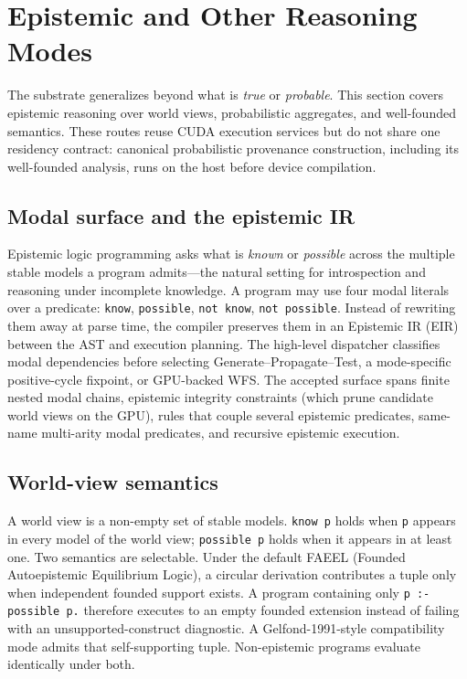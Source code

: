 \section{Epistemic and Other Reasoning Modes}\label{sec:epistemic}

The substrate generalizes beyond what is \emph{true} or \emph{probable}. This section covers epistemic reasoning over world views, probabilistic aggregates, and well-founded semantics. These routes reuse CUDA execution services but do not share one residency contract: canonical probabilistic provenance construction, including its well-founded analysis, runs on the host before device compilation.

\subsection{Modal surface and the epistemic IR}

Epistemic logic programming asks what is \emph{known} or \emph{possible} across the multiple stable models a program admits---the natural setting for introspection and reasoning under incomplete knowledge. A program may use four modal literals over a predicate: \texttt{know}, \texttt{possible}, \texttt{not know}, \texttt{not possible}. Instead of rewriting them away at parse time, the compiler preserves them in an Epistemic IR (EIR) between the AST and execution planning. The high-level dispatcher classifies modal dependencies before selecting Generate--Propagate--Test, a mode-specific positive-cycle fixpoint, or GPU-backed WFS. The accepted surface spans finite nested modal chains, epistemic integrity constraints (which prune candidate world views on the GPU), rules that couple several epistemic predicates, same-name multi-arity modal predicates, and recursive epistemic execution.

\subsection{World-view semantics}

A world view is a non-empty set of stable models. \texttt{know p} holds when \texttt{p} appears in every model of the world view; \texttt{possible p} holds when it appears in at least one. Two semantics are selectable. Under the default FAEEL (Founded Autoepistemic Equilibrium Logic), a circular derivation contributes a tuple only when independent founded support exists. A program containing only \texttt{p :- possible p.} therefore executes to an empty founded extension instead of failing with an unsupported-construct diagnostic. A Gelfond-1991-style compatibility mode admits that self-supporting tuple. Non-epistemic programs evaluate identically under both.

